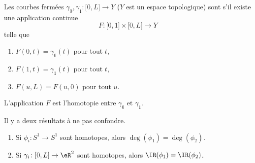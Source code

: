 \begin{definition}     \label{DEFooHJQTooYUFcee}
    Les courbes fermées \( \gamma_0,\gamma_1\colon \mathopen[ 0 , L \mathclose]\to Y\) (\( Y\) est un espace topologique) sont  s'il existe une application continue
    \begin{equation}
        F\colon \mathopen[ 0 , 1 \mathclose]\times \mathopen[ 0 , L \mathclose]\to Y
    \end{equation}
    telle que
    \begin{enumerate}
        \item
           \( F(0,t)=\gamma_0(t)\) pour tout \( t\),
       \item
           \( F(1,t)=\gamma_1(t)\) pour tout \( t\),
       \item
           \( F(u,L)=F(u,0)\) pour tout \( u\).
    \end{enumerate}
    L'application \( F\) est l'homotopie entre \( \gamma_0\) et \( \gamma_1\).
\end{definition}

\begin{proposition}      \label{PROPooZIAKooHqtnZj}
    Il y a deux résultats à ne pas confondre.
    \begin{enumerate}
        \item   \label{ITEMooLEHFooXEyTHY}
            Si \( \phi_i\colon S^1\to S^1\) sont homotopes, alors \( \deg(\phi_1)=\deg(\phi_2)\).
        \item
            Si \(\gamma_i\colon \mathopen[ 0 , L \mathclose]\to \eR^2 \) sont homotopes, alors \( \IR(\phi_1)=\IR(\phi_2)\).
    \end{enumerate}
\end{proposition}

